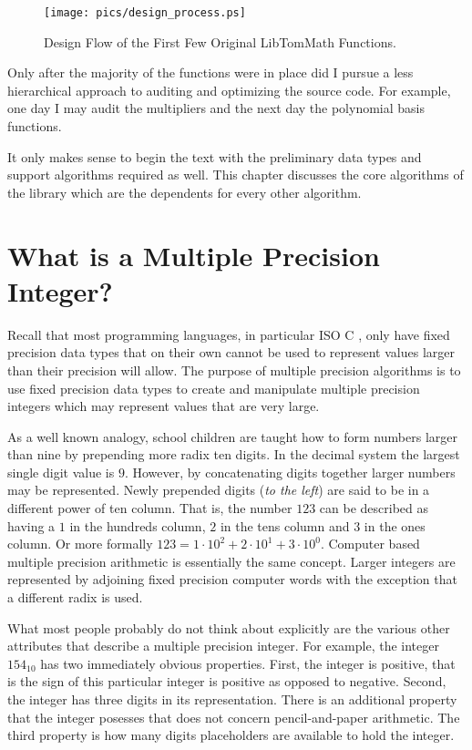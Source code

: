 \documentclass[b5paper]{book}
\begin{document}
\begin{center}
\begin{figure}[here]
\texttt{[image: pics/design\_process.ps]}
\caption{Design Flow of the First Few Original LibTomMath Functions.}
\label{pic:design_process}
\end{figure}
\end{center}

Only after the majority of the functions were in place did I pursue a less hierarchical approach to auditing and optimizing
the source code.  For example, one day I may audit the multipliers and the next day the polynomial basis functions.  

It only makes sense to begin the text with the preliminary data types and support algorithms required as well.  
This chapter discusses the core algorithms of the library which are the dependents for every other algorithm.

\section{What is a Multiple Precision Integer?}
Recall that most programming languages, in particular ISO C \cite{ISOC}, only have fixed precision data types that on their own cannot 
be used to represent values larger than their precision will allow. The purpose of multiple precision algorithms is 
to use fixed precision data types to create and manipulate multiple precision integers which may represent values 
that are very large.  

As a well known analogy, school children are taught how to form numbers larger than nine by prepending more radix ten digits.  In the decimal system
the largest single digit value is $9$.  However, by concatenating digits together larger numbers may be represented.  Newly prepended digits 
(\textit{to the left}) are said to be in a different power of ten column.  That is, the number $123$ can be described as having a $1$ in the hundreds 
column, $2$ in the tens column and $3$ in the ones column.  Or more formally $123 = 1 \cdot 10^2 + 2 \cdot 10^1 + 3 \cdot 10^0$.  Computer based 
multiple precision arithmetic is essentially the same concept.  Larger integers are represented by adjoining fixed 
precision computer words with the exception that a different radix is used.

What most people probably do not think about explicitly are the various other attributes that describe a multiple precision 
integer.  For example, the integer $154_{10}$ has two immediately obvious properties.  First, the integer is positive, 
that is the sign of this particular integer is positive as opposed to negative.  Second, the integer has three digits in 
its representation.  There is an additional property that the integer posesses that does not concern pencil-and-paper 
arithmetic.  The third property is how many digits placeholders are available to hold the integer.  
\end{document}
